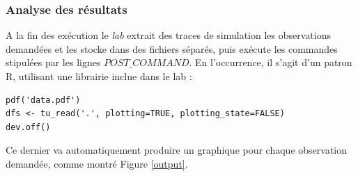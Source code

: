 \documentclass[parallelisme]{compas2017}
\newcommand\smalltt[1]{\texttt{\small #1}}
\begin{document}
\subsubsection{Analyse des résultats}

A la fin des exécution le \emph{lab} extrait des traces de simulation les 
observations demandées et les stocke dans des fichiers séparés, puis exécute 
les commandes stipulées par les lignes \smalltt{$POST\_COMMAND$}. En 
l'occurrence, il s'agit d'un patron R, utilisant une librairie inclue dans le 
lab :

\begin{lstlisting}
pdf('data.pdf')
dfs <- tu_read('.', plotting=TRUE, plotting_state=FALSE)
dev.off()
\end{lstlisting}

Ce dernier va automatiquement produire un graphique pour chaque observation 
demandée, comme montré Figure \ref{output}.
\end{document}
